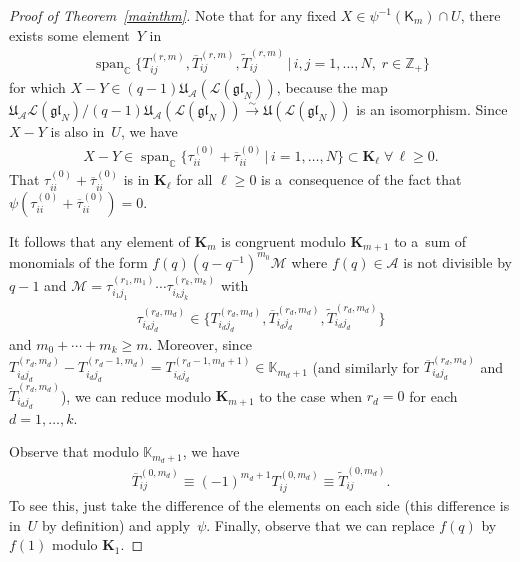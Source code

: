 \documentclass[11pt]{article}
\numberwithin{theorem}{section}
\numberwithin{proposition}{section}
\numberwithin{lemma}{section}
\numberwithin{corollary}{section}
\numberwithin{definition}{section}
\numberwithin{example}{section}
\numberwithin{remark}{section}
\numberwithin{note}{section}
\numberwithin{equation}{section}
\begin{document}
\begin{proof}[Proof of Theorem~\ref{mainthm}]
Note that for any f\/ixed $X \in \psi^{-1}(\mathsf{K}_m) \cap U$, there exists some element~$Y$ in
 \begin{gather*}
\operatorname{span}_{\mathbb{C}}\big\{T_{ij}^{(r,m)},\overline{T}_{ij}^{(r,m)},\widetilde{T}_{ij}^{(r,m)} \,|\, i,j=1,\ldots,N,\; r \in
\mathbb{Z}_+\big\}
\end{gather*}
for which $X-Y \in (q-1)\mathfrak{U}_{\mathcal{A}}(\mathcal{L}(\mathfrak{gl}_N))$, because the map
$\mathfrak{U}_{\mathcal{A}}\mathcal{L}(\mathfrak{gl}_N)
/(q-1)\mathfrak{U}_{\mathcal{A}}(\mathcal{L}(\mathfrak{gl}_N))
\stackrel{\sim}{\longrightarrow} \mathfrak{U}(\mathcal{L}(\mathfrak{gl}_N))$ is an isomorphism.
Since $X-Y$ is also in~$U$, we have{\samepage
\begin{gather*}
X-Y \in \operatorname{span}_{\mathbb{C}} \big\{\tau_{ii}^{(0)}+\overline{\tau}_{ii}^{(0)} \,|\, i=1,\ldots,N\big\} \subset \mathbf{K}_{\ell}
 \; \forall\, \ell \geq 0.
\end{gather*}
That $\tau_{ii}^{(0)}+\overline{\tau}_{ii}^{(0)}$ is in $\mathbf{K}_{\ell}$ for all $\ell \geq 0$ is a~consequence of the
fact that $\psi(\tau_{ii}^{(0)}+\overline{\tau}_{ii}^{(0)})=0$.}

It follows that any element of $\mathbf{K}_m$ is congruent modulo $\mathbf{K}_{m+1}$ to a~sum of monomials of the form
$f(q)(q-q^{-1})^{m_0}\mathcal{M}$ where $f(q) \in \mathcal{A}$ is not divisible by $q-1$ and $\mathcal{M}=\tau_{i_1
j_1}^{(r_1,m_1)} \cdots \tau_{i_k j_k}^{(r_k,m_k)}$ with
\begin{gather*}
\tau_{i_d j_d}^{(r_d,m_d)} \in \big\{T_{i_d j_d}^{(r_d,m_d)}, \overline{T}_{i_d j_d}^{(r_d,m_d)}, \widetilde{T}_{i_d
j_d}^{(r_d,m_d)}\big\}
\end{gather*}
and $m_0+\cdots+m_k \geq m$.
Moreover, since $T_{i_d j_d}^{(r_d,m_d)}-T_{i_d j_d}^{(r_d-1,m_d)}=T_{i_d j_d}^{(r_d-1,m_d+1)} \in \mathbb{K}_{m_d+1}$
(and similarly for $\overline{T}_{i_d j_d}^{(r_d,m_d)}$ and $\widetilde{T}_{i_d j_d}^{(r_d,m_d)}$), we can reduce modulo
$\mathbf{K}_{m+1}$ to the case when $r_d=0$ for each $d=1,\ldots,k$.

Observe that modulo $\mathbb{K}_{m_d+1}$, we have
\begin{gather}
\overline{T}_{ij}^{(0,m_d)} \equiv (-1)^{m_d+1}T_{ij}^{(0,m_d)} \equiv \widetilde{T}_{ij}^{(0,m_d)}.
\label{TbarT}
\end{gather}
To see this, just take the dif\/ference of the elements on each side (this dif\/ference is in~$U$ by def\/inition) and
apply~$\psi$.
Finally, observe that we can replace $f(q)$ by $f(1)$ modulo $\mathbf{K}_{1}$.


\end{proof}
\end{document}
